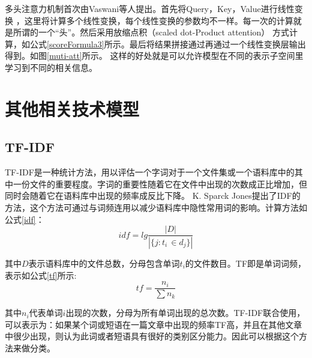 多头注意力机制首次由Vaswani等人提出。首先将Query，Key，Value进行线性变换
，这里将计算多个线性变换，每个线性变换的参数均不一样。每一次的计算就是所谓的一个“头”。然后采用放缩点积（scaled dot-Product attention）
方式计算，如公式\ref{scoreFormula3}所示。最后将结果拼接通过再通过一个线性变换层输出得到。如图\ref{muti-att}所示。
这样的好处就是可以允许模型在不同的表示子空间里学习到不同的相关信息。
\section{其他相关技术模型}
\subsection{TF-IDF}
TF-IDF是一种统计方法，用以评估一个字词对于一个文件集或一个语料库中的其中一份文件的重要程度。字词的重要性随着它在文件中出现的次数成正比增加，但同时会随着它在语料库中出现的频率成反比下降。
K. Sparck Jones提出了IDF的方法，这个方法可通过与词频连用以减少语料库中隐性常用词的影响。计算方法如公式\ref{idf}：
\begin{equation}\label{idf}
	idf=lg\frac{\left|D\right|}{\left|\{j:t_{i\ }\in d_j\}\right|}
\end{equation}

其中$D$表示语料库中的文件总数，分母包含单词$t_i$的文件数目。TF即是单词词频，表示如公式\ref{tf}所示:
\begin{equation}\label{tf}
	tf=\frac{n_i}{\sum n_k}
\end{equation}

其中$n_i$代表单词$i$出现的次数，分母为所有单词出现的总次数。TF-IDF联合使用，可以表示为：如果某个词或短语在一篇文章中出现的频率TF高，并且在其他文章中很少出现，则认为此词或者短语具有很好的类别区分能力。因此可以根据这个方法来做分类。

